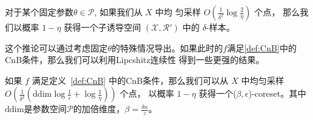 \begin{corollary}
    对于某个固定参数$\theta \in \mathcal{P}$, 如果我们从 $X$ 中均
    匀采样 $O\left(\frac{1}{\delta^2}  \log \frac{2}{\eta}\right)$ 个点，
    那么我们以概率 $1 - \eta$ 获得一个子诱导空间 $(\mathcal{X}, \mathcal{R}')$ 中的 $\delta$-样本。
    \label{cor:fixed theta}
\end{corollary}   

这个推论可以通过考虑固定$\theta$的特殊情况导出。如果此时的$f$满足\ref{def:CnB}中的CnB条件，那么我们可以利用Lipcshitz连续性
得到一些更强的结果。

\begin{theorem}
    如果 $f$ 满足定义~\ref{def:CnB} 中的CnB条件，那么我们可以从 $X$ 中均匀采样 $O\left(\frac{1}{\delta^2} \left(\text{ddim}\log \frac 1 \varepsilon + \log \frac{1}{\eta}\right)\right)$ 个点，
    以概率 $1 - \eta$ 获得一个($\beta, \epsilon$)-coreset。其中$\text{ddim}$是参数空间$\mathcal{P}$的加倍维度，$\beta = \frac{\delta n}{z}$。
\end{theorem}

